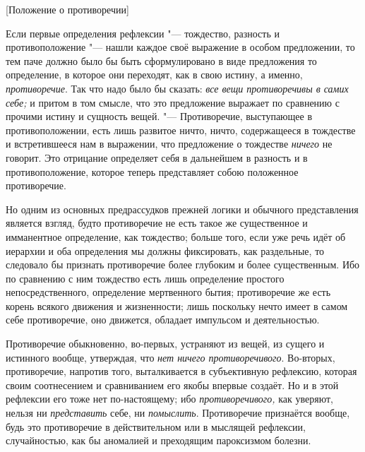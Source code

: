 %
  {[Положение о противоречии]}

Если первые определения рефлексии "--- тождество, разность и противоположение
"--- нашли каждое своё выражение в особом предложении, то тем паче должно было
бы быть сформулировано в виде предложения то определение, в которое они
переходят, как в свою истину, а именно,
{\em противоречие}. Так что надо было бы сказать:
{\em все вещи противоречивы в самих себе;} и притом в
том смысле, что это предложение выражает по сравнению с прочими истину и
сущность вещей. "--- Противоречие, выступающее в противоположении, есть лишь
развитое ничто, ничто, содержащееся в тождестве и встретившееся нам в
выражении, что предложение о тождестве {\em ничего} не
говорит. Это отрицание определяет себя в дальнейшем в разность и в
противоположение, которое теперь представляет собою положенное противоречие.

Но одним из основных предрассудков прежней логики и обычного представления
является взгляд, будто противоречие не есть такое же существенное и
имманентное определение, как тождество; больше того, если уже речь идёт об
иерархии и оба определения мы должны фиксировать, как раздельные, то
следовало бы признать противоречие более глубоким и более существенным. Ибо
по сравнению с ним тождество есть лишь определение простого
непосредственного, определение мертвенного бытия; противоречие же есть
корень всякого движения и жизненности; лишь поскольку нечто имеет в самом
себе противоречие, оно движется, обладает импульсом и деятельностью.

Противоречие обыкновенно, во-первых, устраняют из вещей, из сущего и
истинного вообще, утверждая, что {\em нет ничего
противоречивого}. Во-вторых, противоречие, напротив того, выталкивается в
субъективную рефлексию, которая своим соотнесением и сравниванием его якобы
впервые создаёт. Но и в этой рефлексии его тоже нет по-настоящему; ибо
{\em противоречивого,} как уверяют, нельзя ни {\em представить} себе, ни
{\em помыслить}. Противоречие признаётся вообще, будь
это противоречие в действительном или в мыслящей рефлексии, случайностью,
как бы аномалией и преходящим пароксизмом болезни.


